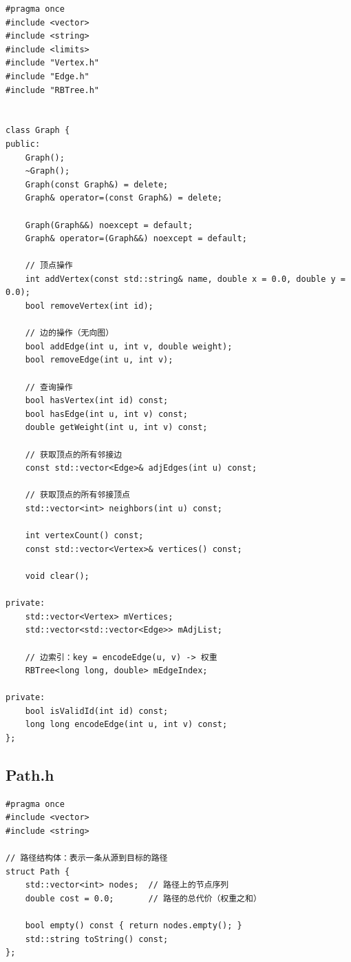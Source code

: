 \documentclass[UTF8,12pt,a4paper]{ctexart}
\begin{document}
\begin{lstlisting}[caption={Graph.h 源码}]
#pragma once
#include <vector>
#include <string>
#include <limits>
#include "Vertex.h"
#include "Edge.h"
#include "RBTree.h"


class Graph {
public:
    Graph();
    ~Graph();
    Graph(const Graph&) = delete;
    Graph& operator=(const Graph&) = delete;

    Graph(Graph&&) noexcept = default;
    Graph& operator=(Graph&&) noexcept = default;

    // 顶点操作
    int addVertex(const std::string& name, double x = 0.0, double y = 0.0);
    bool removeVertex(int id);

    // 边的操作（无向图）
    bool addEdge(int u, int v, double weight);
    bool removeEdge(int u, int v);

    // 查询操作
    bool hasVertex(int id) const;
    bool hasEdge(int u, int v) const;
    double getWeight(int u, int v) const;

    // 获取顶点的所有邻接边
    const std::vector<Edge>& adjEdges(int u) const;
    
    // 获取顶点的所有邻接顶点
    std::vector<int> neighbors(int u) const;

    int vertexCount() const;
    const std::vector<Vertex>& vertices() const;

    void clear();

private:
    std::vector<Vertex> mVertices;
    std::vector<std::vector<Edge>> mAdjList;

    // 边索引：key = encodeEdge(u, v) -> 权重
    RBTree<long long, double> mEdgeIndex;

private:
    bool isValidId(int id) const;
    long long encodeEdge(int u, int v) const;
};

\end{lstlisting}

\subsection{Path.h}

\begin{lstlisting}[caption={Path.h 源码}]
#pragma once
#include <vector>
#include <string>

// 路径结构体：表示一条从源到目标的路径
struct Path {
    std::vector<int> nodes;  // 路径上的节点序列
    double cost = 0.0;       // 路径的总代价（权重之和）

    bool empty() const { return nodes.empty(); }
    std::string toString() const;
};

\end{lstlisting}
\end{document}
